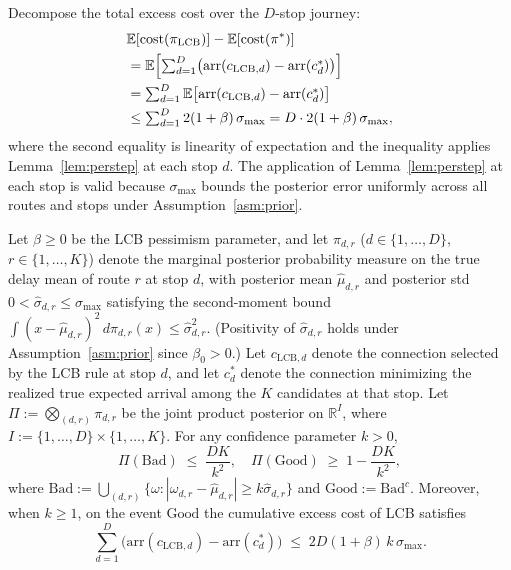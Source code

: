 \documentclass[opre,dblanonrev]{informs4}
\renewenvironment{proof}{\Trivlist\item[\hspace*{1em}\hskip\labelsep{\itshape Proof.\enskip}]\ignorespaces}{\endTrivlist\addvspace{0pt}}
\begin{document}
\begin{proof}
Decompose the total excess cost over the $D$-stop journey:
\begin{align}
&\mathbb{E}[\mathrm{cost}(\pi_{\mathrm{LCB}})] - \mathbb{E}[\mathrm{cost}(\pi^*)] \notag \\
&= \mathbb{E}\Bigl[\textstyle\sum_{d=1}^{D}
   \bigl(\mathrm{arr}(c_{\mathrm{LCB},d}) - \mathrm{arr}(c^*_d)\bigr)\Bigr] \notag \\
&= \textstyle\sum_{d=1}^{D}
   \mathbb{E}\bigl[\mathrm{arr}(c_{\mathrm{LCB},d}) - \mathrm{arr}(c^*_d)\bigr]
   \notag \\
&\leq \textstyle\sum_{d=1}^{D} 2(1+\beta)\,\sigma_{\max}
   = D \cdot 2(1+\beta)\,\sigma_{\max},
\end{align}
where the second equality is linearity of expectation and the inequality
applies Lemma~\ref{lem:perstep} at each stop $d$.
The application of Lemma~\ref{lem:perstep} at each stop is valid because
$\sigma_{\max}$ bounds the posterior error uniformly across all routes and stops
under Assumption~\ref{asm:prior}.
\end{proof}

\begin{theorem}\label{thm:lcb_high_prob}
Let $\beta \geq 0$ be the LCB pessimism parameter, and let
$\pi_{d,r}$ ($d \in \{1,\ldots,D\}$, $r \in \{1,\ldots,K\}$) denote
the marginal posterior probability measure on the true delay mean of
route $r$ at stop $d$, with posterior mean $\hat\mu_{d,r}$ and
posterior std $0 < \hat\sigma_{d,r} \leq \sigma_{\max}$ satisfying
the second-moment bound
$\int (x - \hat\mu_{d,r})^2\,d\pi_{d,r}(x) \leq \hat\sigma_{d,r}^2$.
(Positivity of $\hat\sigma_{d,r}$ holds under
Assumption~\ref{asm:prior} since $\beta_0 > 0$.) Let $c_{\mathrm{LCB},d}$
denote the connection selected by the LCB rule at stop $d$, and let
$c^*_d$ denote the connection minimizing the realized true expected
arrival among the $K$ candidates at that stop. Let
$\Pi := \bigotimes_{(d,r)} \pi_{d,r}$ be the joint product posterior
on $\mathbb{R}^{I}$, where $I := \{1,\ldots,D\} \times \{1,\ldots,K\}$.
For any confidence parameter $k > 0$,
\begin{equation}
\Pi(\mathrm{Bad}) \;\leq\; \frac{DK}{k^2},
\quad
\Pi(\mathrm{Good}) \;\geq\; 1 - \frac{DK}{k^2},
\label{eq:joint_prob}
\end{equation}
where
$\mathrm{Bad} := \bigcup_{(d,r)} \{\omega : |\omega_{d,r} - \hat\mu_{d,r}| \geq k\hat\sigma_{d,r}\}$
and $\mathrm{Good} := \mathrm{Bad}^c$. Moreover, when $k \geq 1$, on
the event $\mathrm{Good}$ the cumulative excess cost of LCB satisfies
\begin{equation}
\sum_{d=1}^{D} \bigl(\mathrm{arr}(c_{\mathrm{LCB},d})
- \mathrm{arr}(c^*_d)\bigr)
\;\leq\; 2 D (1{+}\beta)\, k\, \sigma_{\max}.
\label{eq:cum_high_prob}
\end{equation}
\end{theorem}
\end{document}
